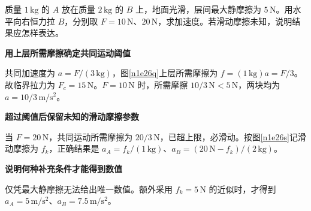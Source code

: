 \begin{question}\begin{example}[最大静摩擦不能替代滑动摩擦]\label{n1e26}
质量 $1\,\mathrm{kg}$ 的 $A$ 放在质量 $2\,\mathrm{kg}$ 的 $B$ 上，地面光滑，层间最大静摩擦为 $5\,\mathrm N$。用水平向右恒力拉 $B$，分别取 $F=10\,\mathrm N$、$20\,\mathrm N$，求加速度。若滑动摩擦未知，说明结果应怎样表达。
\end{example}\end{question}
\begin{solution}\textbf{用上层所需摩擦确定共同运动阈值}\par\nobreak
共同加速度为 $a=F/(3\,\mathrm{kg})$，图\ref{n1e26q}上层所需摩擦为 $f=(1\,\mathrm{kg})a=F/3$。故临界拉力为 $F_c=15\,\mathrm N$。$F=10\,\mathrm N$ 时，所需摩擦 $10/3\,\mathrm N<5\,\mathrm N$，两块均为 $a=10/3\,\mathrm{m/s^2}$。


\par\medskip{}\noindent\textbf{超过阈值后保留未知的滑动摩擦参数}\par\nobreak
当 $F=20\,\mathrm N$，共同运动所需摩擦为 $20/3\,\mathrm N$，已超上限，必滑动。按图\ref{n1e26s}记滑动摩擦为 $f_k$，正确结果是 $a_A=f_k/(1\,\mathrm{kg})$、$a_B=(20\,\mathrm N-f_k)/(2\,\mathrm{kg})$。

\par\medskip{}\noindent\textbf{说明何种补充条件才能得到数值}\par\nobreak
仅凭最大静摩擦无法给出唯一数值。额外采用 $f_k=5\,\mathrm N$ 的近似时，才得到 $a_A=5\,\mathrm{m/s^2}$、$a_B=7.5\,\mathrm{m/s^2}$。
\end{solution}

